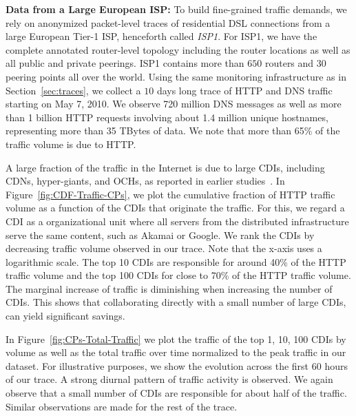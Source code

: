 \noindent\textbf{Data from a Large European ISP:}\label{sec:Residential-Traces}
To build fine-grained traffic demands, we rely on anonymized packet-level
traces of residential DSL connections from a large European Tier-1 ISP,
henceforth called \emph{ISP1}. For ISP1, we have the complete annotated
router-level topology including the router locations as well as all public and
private peerings. ISP1 contains more than $650$ routers and $30$ peering points
all over the world.  Using the same monitoring infrastructure as in
Section~\ref{sec:traces}, we collect a $10$ days long trace of HTTP and DNS
traffic starting on May 7, 2010. We observe 720 million DNS messages as well as
more than 1 billion HTTP requests involving about 1.4 million unique hostnames,
representing more than 35 TBytes of data. We note that more than 65\% of the
traffic volume is due to HTTP.

A large fraction of the traffic in the Internet is due to large CDIs, including
CDNs, hyper-giants, and OCHs, as reported in earlier
studies~\cite{TrafficTypesGrowth:2011,arbor,PADIS2010}. In
Figure~\ref{fig:CDF-Traffic-CPs}, we plot the cumulative fraction of HTTP
traffic volume as a function of the CDIs that originate the traffic. For this,
we regard a CDI as a organizational unit where all servers from the distributed
infrastructure serve the same content, such as Akamai or Google.  We rank the
CDIs by decreasing traffic volume observed in our trace. Note that the x-axis
uses a logarithmic scale. The top 10 CDIs are responsible for around 40\% of
the HTTP traffic volume and the top 100 CDIs for close to 70\% of the HTTP
traffic volume. The marginal increase of traffic is diminishing when increasing
the number of CDIs. This shows that collaborating directly with a small number
of large CDIs, can yield significant savings.

In Figure~\ref{fig:CPs-Total-Traffic} we plot the traffic of the top 1, 10, 100
CDIs by volume as well as the total traffic over time normalized to the peak
traffic in our dataset.  For illustrative purposes, we show the evolution
across the first $60$ hours of our trace. A strong diurnal pattern of traffic
activity is observed. We again observe that a small number of CDIs are
responsible for about half of the traffic. Similar observations are made for
the rest of the trace.

